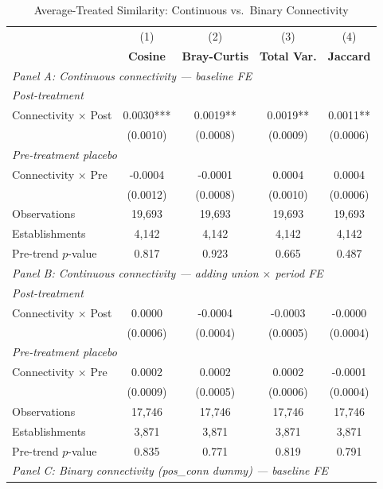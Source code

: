 \begin{table}[H]
\centering
\caption{Average-Treated Similarity: Continuous vs.\ Binary Connectivity}
\scriptsize
\setlength{\tabcolsep}{6pt}
\begin{tabular}{lcccc}
\hline\hline
 & (1) & (2) & (3) & (4) \\
 & \textbf{Cosine} & \textbf{Bray-Curtis} & \textbf{Total Var.} & \textbf{Jaccard} \\
\hline
\multicolumn{5}{l}{\textit{Panel A: Continuous connectivity — baseline FE}} \\
\multicolumn{5}{l}{\textit{Post-treatment}} \\
Connectivity $\times$ Post & 0.0030*** & 0.0019** & 0.0019** & 0.0011** \\
 & (0.0010) & (0.0008) & (0.0009) & (0.0006) \\
\multicolumn{5}{l}{\textit{Pre-treatment placebo}} \\
Connectivity $\times$ Pre & -0.0004 & -0.0001 & 0.0004 & 0.0004 \\
 & (0.0012) & (0.0008) & (0.0010) & (0.0006) \\
\hline
Observations &       19,693 &       19,693 &       19,693 &       19,693 \\
Establishments &        4,142 &        4,142 &        4,142 &        4,142 \\
Pre-trend $p$-value & 0.817 & 0.923 & 0.665 & 0.487 \\
\hline
\multicolumn{5}{l}{\textit{Panel B: Continuous connectivity — adding union $\times$ period FE}} \\
\multicolumn{5}{l}{\textit{Post-treatment}} \\
Connectivity $\times$ Post & 0.0000 & -0.0004 & -0.0003 & -0.0000 \\
 & (0.0006) & (0.0004) & (0.0005) & (0.0004) \\
\multicolumn{5}{l}{\textit{Pre-treatment placebo}} \\
Connectivity $\times$ Pre & 0.0002 & 0.0002 & 0.0002 & -0.0001 \\
 & (0.0009) & (0.0005) & (0.0006) & (0.0004) \\
\hline
Observations &       17,746 &       17,746 &       17,746 &       17,746 \\
Establishments &        3,871 &        3,871 &        3,871 &        3,871 \\
Pre-trend $p$-value & 0.835 & 0.771 & 0.819 & 0.791 \\
\hline
\multicolumn{5}{l}{\textit{Panel C: Binary connectivity (pos\_conn dummy) — baseline FE}} \\

\end{tabular}
\end{table}
